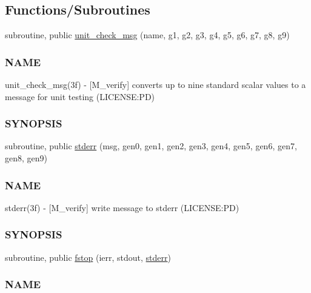 \subsection*{Functions/\+Subroutines}
\begin{DoxyCompactItemize}
\item 
subroutine, public \mbox{\hyperlink{namespacem__verify_a74ea8b4574606c4f72e97b115375fc9b}{unit\+\_\+check\+\_\+msg}} (name, g1, g2, g3, g4, g5, g6, g7, g8, g9)
\begin{DoxyCompactList}\small\item\em \subsubsection*{N\+A\+ME}

unit\+\_\+check\+\_\+msg(3f) -\/ \mbox{[}M\+\_\+verify\mbox{]} converts up to nine standard scalar values to a message for unit testing (L\+I\+C\+E\+N\+SE\+:PD) \subsubsection*{S\+Y\+N\+O\+P\+S\+IS}\end{DoxyCompactList}\item 
subroutine, public \mbox{\hyperlink{namespacem__verify_a41f795f932767c97b5ef481a694f4f84}{stderr}} (msg, gen0, gen1, gen2, gen3, gen4, gen5, gen6, gen7, gen8, gen9)
\begin{DoxyCompactList}\small\item\em \subsubsection*{N\+A\+ME}

stderr(3f) -\/ \mbox{[}M\+\_\+verify\mbox{]} write message to stderr (L\+I\+C\+E\+N\+SE\+:PD) \subsubsection*{S\+Y\+N\+O\+P\+S\+IS}\end{DoxyCompactList}\item 
subroutine, public \mbox{\hyperlink{namespacem__verify_a2695833d468118d68918d6aeabab6d0b}{fstop}} (ierr, stdout, \mbox{\hyperlink{namespacem__verify_a41f795f932767c97b5ef481a694f4f84}{stderr}})
\begin{DoxyCompactList}\small\item\em \subsubsection*{N\+A\+ME}


\end{DoxyCompactList}
\end{DoxyCompactItemize}
